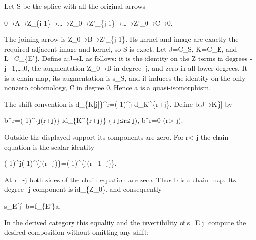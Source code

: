 Let S be the splice with all the original arrows:\allowbreak{}

0\allowbreak{}→A\allowbreak{}→Z\_\allowbreak{}\{i-1\}\allowbreak{}→…\allowbreak{}→Z\_\allowbreak{}0\allowbreak{}→Z'\_\allowbreak{}\{j-1\}\allowbreak{}→…\allowbreak{}→Z'\_\allowbreak{}0\allowbreak{}→C\allowbreak{}→0.

The joining arrow is Z\_\allowbreak{}0\allowbreak{}→B\allowbreak{}→Z'\_\allowbreak{}\{j-1\}. Its kernel and image are exactly the required adjacent image and kernel,\allowbreak{} so S is exact. Let J\allowbreak{}=C\_\allowbreak{}S,\allowbreak{} K\allowbreak{}=C\_\allowbreak{}E,\allowbreak{} and L\allowbreak{}=C\_\allowbreak{}\{E'\}. Define a:\allowbreak{}J\allowbreak{}→L as follows:\allowbreak{} it is the identity on the Z\textquotesingle{} terms in degrees -j\allowbreak{}+1,\allowbreak{}…,\allowbreak{}0,\allowbreak{} the augmentation Z\_\allowbreak{}0\allowbreak{}→B in degree -j,\allowbreak{} and zero in all lower degrees. It is a chain map,\allowbreak{} its augmentation is s\_\allowbreak{}S,\allowbreak{} and it induces the identity on the only nonzero cohomology,\allowbreak{} C in degree 0. Hence a is a quasi-isomorphism.

The shift convention is d\_\allowbreak{}\{K[j]\allowbreak{}\}\textasciicircum{}r\allowbreak{}=(-1)\allowbreak{}\textasciicircum{}j d\_\allowbreak{}K\textasciicircum{}\{r\allowbreak{}+j\}. Define b:\allowbreak{}J\allowbreak{}→K[j]\allowbreak{} by

b\textasciicircum{}r\allowbreak{}=(-1)\allowbreak{}\textasciicircum{}\{j(r\allowbreak{}+j)\allowbreak{}\} id\_\allowbreak{}\{K\textasciicircum{}\{r\allowbreak{}+j\}\} (-i-j≤r≤-j)\allowbreak{},\allowbreak{} b\textasciicircum{}r\allowbreak{}=0 (r>-j)\allowbreak{}.

Outside the displayed support its components are zero. For r\textless-j the chain equation is the scalar identity

(-1)\allowbreak{}\textasciicircum{}j(-1)\allowbreak{}\textasciicircum{}\{j(r\allowbreak{}+j)\allowbreak{}\}\allowbreak{}=(-1)\allowbreak{}\textasciicircum{}\{j(r\allowbreak{}+1\allowbreak{}+j)\allowbreak{}\}.

At r\allowbreak{}=-j both sides of the chain equation are zero. Thus b is a chain map. Its degree -j component is id\_\allowbreak{}\{Z\_\allowbreak{}0\},\allowbreak{} and consequently

s\_\allowbreak{}E[j]\allowbreak{} b\allowbreak{}=f\_\allowbreak{}\{E'\}a.

In the derived category this equality and the invertibility of s\_\allowbreak{}E[j]\allowbreak{} compute the desired composition without omitting any shift:\allowbreak{}

